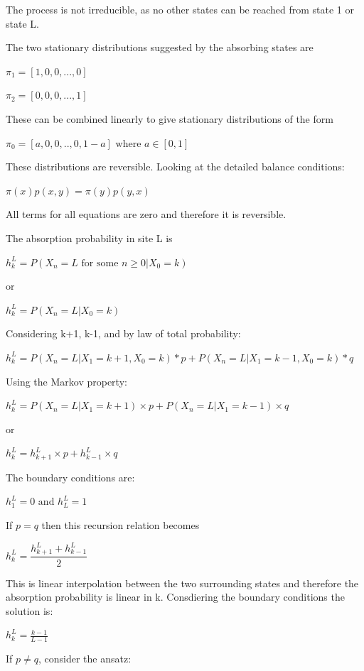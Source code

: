 \documentclass{article}
\begin{document}
\bigskip

The process is not irreducible, as no other states can be reached from state 1 or state L. 

The two stationary distributions suggested by the absorbing states are

$\pi_1 = [1,0,0,...,0]$

$\pi_2 = [0,0,0,...,1]$

These can be combined linearly to give stationary distributions of the form

$\pi_0 = [a,0,0,..,0,1-a] \text{ where } a \in [0,1]$

These distributions are reversible. Looking at the detailed balance conditions:

$\pi(x)p(x,y) = \pi(y)p(y,x)$ 

All terms for all equations are zero and therefore it is reversible.

\bigskip




The absorption probability in site L is 

$h_k^L = P(X_n = L \text{ for some } n \geq 0|X_0 = k)$

or

$h_k^L = P(X_n = L | X_0 = k)$

Considering k+1, k-1, and by law of total probability:

$h_{k}^L = P(X_n = L | X_1 = k+1, X_0 = k) * p + P(X_n = L | X_1 = k-1, X_0 = k) * q $

Using the Markov property:

$h_{k}^L = P(X_n = L | X_1 = k+1) \times p + P(X_n = L | X_1 = k-1) \times q $

or

$h_{k}^L = h_{k+1}^L \times p + h_{k-1}^L \times q $

The boundary conditions are:

$h_{1}^L = 0 \text{ and } h_{L}^L = 1$

\bigskip

If $p=q$ then this recursion relation becomes 

$h_{k}^L = \dfrac{h_{k+1}^L + h_{k-1}^L}{2} $

This is linear interpolation between the two surrounding states and therefore the absorption probability is linear in k. Consdiering the boundary conditions the solution is:

$h_{k}^L = \frac{k-1}{L-1}$

\bigskip

If $p\neq q$, consider the ansatz:
\end{document}
